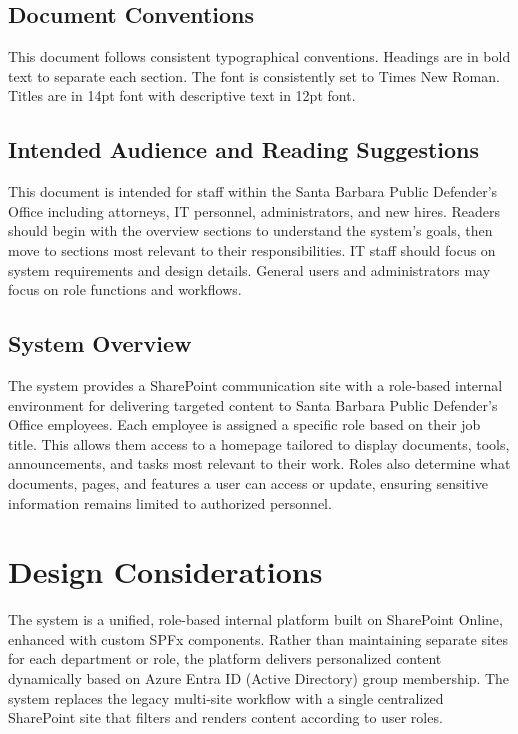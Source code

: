 \documentclass[12pt]{article}
\begin{document}
\subsection{Document Conventions}

This document follows consistent typographical conventions. Headings are in bold text to separate each section. The font is consistently set to Times New Roman. Titles are in 14pt font with descriptive text in 12pt font.

\subsection{Intended Audience and Reading Suggestions}

This document is intended for staff within the Santa Barbara Public Defender's Office including attorneys, IT personnel, administrators, and new hires. Readers should begin with the overview sections to understand the system's goals, then move to sections most relevant to their responsibilities. IT staff should focus on system requirements and design details. General users and administrators may focus on role functions and workflows.

\subsection{System Overview}

The system provides a SharePoint communication site with a role-based internal environment for delivering targeted content to Santa Barbara Public Defender's Office employees. Each employee is assigned a specific role based on their job title. This allows them access to a homepage tailored to display documents, tools, announcements, and tasks most relevant to their work. Roles also determine what documents, pages, and features a user can access or update, ensuring sensitive information remains limited to authorized personnel.

\section{Design Considerations}

The system is a unified, role-based internal platform built on SharePoint Online, enhanced with custom SPFx components. Rather than maintaining separate sites for each department or role, the platform delivers personalized content dynamically based on Azure Entra ID (Active Directory) group membership. The system replaces the legacy multi-site workflow with a single centralized SharePoint site that filters and renders content according to user roles.
\end{document}
